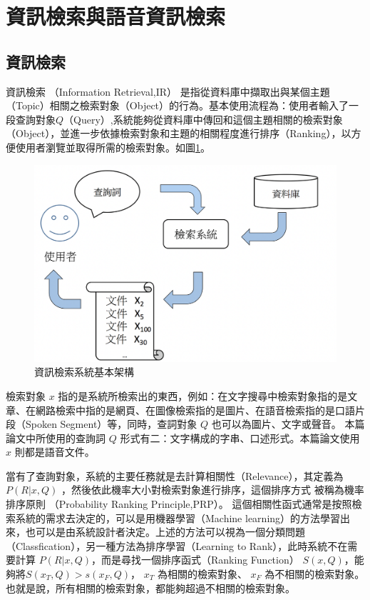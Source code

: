 \section{資訊檢索與語音資訊檢索}

\subsection{資訊檢索}


資訊檢索 （Information Retrieval,IR）
是指從資料庫中擷取出與某個主題（Topic）相關之檢索對象（Object）的行為。基本使用流程為：使用者輸入了一段查詢對象$Q$（Query）,系統能夠從資料庫中傳回和這個主題相關的檢索對象（Object），並進一步依據檢索對象和主題的相關程度進行排序（Ranking），以方便使用者瀏覽並取得所需的檢索對象。如圖\ref{fig:ch2_IR}。
\begin{figure}
\centering
\includegraphics[scale=0.4]{images/ch2_Ir.png}
\caption{資訊檢索系統基本架構} \label{fig:ch2_IR}
\end{figure}

檢索對象 $x$
指的是系統所檢索出的東西，例如：在文字搜尋中檢索對象指的是文章、在網路檢索中指的是網頁、在圖像檢索指的是圖片、在語音檢索指的是口語片段（Spoken Segment）等，同時，查詞對象 $Q$ 也可以為圖片、文字或聲音。
本篇論文中所使用的查詢詞 $Q$ 形式有二：文字構成的字串、口述形式。本篇論文使用 $x$ 則都是語音文件。

當有了查詢對象，系統的主要任務就是去計算相關性（Relevance），其定義為 $P(R|x,Q)$ ，然後依此機率大小對檢索對象進行排序，這個排序方式
被稱為機率排序原則 （Probability Ranking Principle,PRP）\cite{robertson1997probability}。
這個相關性函式通常是按照檢索系統的需求去決定的，可以是用機器學習（Machine
learning）的方法學習出來，也可以是由系統設計者決定。上述的方法可以視為一個分類問題（Classfication），另一種方法為排序學習（Learning
to Rank），此時系統不在需要計算 $P(R|x,Q)$，而是尋找一個排序函式（Ranking Function）
$S(x,Q)$，能夠將$ S(x_T,Q)>s(x_F,Q)$， $x_T$ 為相關的檢索對象、 $x_F$
為不相關的檢索對象。也就是說，所有相關的檢索對象，都能夠超過不相關的檢索對象。

